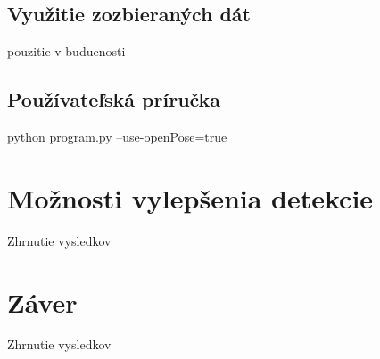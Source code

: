\documentclass[slovak,master,dept460,male,cpp,cpdeclaration]{diploma}
\begin{document}
\newpage
\subsection{Využitie zozbieraných dát}
pouzitie v buducnosti


\newpage
\subsection{Používateľská príručka}
python program.py --use-openPose=true


\newpage
\section{Možnosti vylepšenia detekcie}
\label{sec:Možnosti vylepšenia detekcie}
Zhrnutie vysledkov


\newpage
\section{Záver}
\label{sec:Zaver}
Zhrnutie vysledkov








\end{document}
